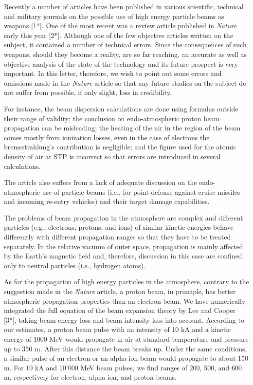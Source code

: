 \documentclass [12pt,a4paper,     ]{report} %
\begin{document}
\noindent  Recently a number of articles have been published in various scientific, technical and military journals on the possible use of high energy particle beams as weapons [1*]. One of the most recent was a review article published in \emph{Nature} early this year [2*].  Although one of the few objective articles written on the subject, it contained a number of technical errors.  Since the consequences of such weapons, should they become a reality, are so far reaching, an accurate as well as objective analysis of the state of the technology and its future prospect is very important.  In this letter, therefore, we wish to point out some errors and omissions made in the \emph{Nature} article so that any future studies on the subject do not suffer from possible, if only slight, loss in credibility.

   For instance, the beam dispersion calculations are done using formulas outside their range of validity; the conclusion on endo-atmospheric proton beam propagation can be misleading; the heating of the air in the region of the beam comes mostly from ionization losses, even in the case of electrons the bremsstrahlung's contribution is negligible; and the figure used for the atomic density of air at STP is incorrect so that errors are introduced in several calculations.

   The article also suffers from a lack of adequate discussion on the endo-atmospheric use of particle beams (i.e., for point defense against cruise-missiles and incoming re-entry vehicles) and their target damage capabilities.

   The problems of beam propagation in the atmosphere are complex and different particles (e.g., electrons, protons, and ions) of similar kinetic energies behave differently with different propagation ranges so that they have to be treated separately.  In the relative vacuum of outer space, propagation is mainly affected by the Earth's magnetic field and, therefore, discussion in this case are confined only to neutral particles (i.e., hydrogen atoms).
 

   As for the propagation of high energy particles in the atmosphere, contrary to the suggestion made in the \emph{Nature} article, a proton beam, in principle, has better atmospheric propagation properties than an electron beam.  We have numerically integrated the full equation of the beam expansion theory by Lee and Cooper [3*], taking beam energy loss and beam intensity loss into account.  According to our estimates, a proton beam pulse with an intensity of 10 kA and a kinetic energy of 1000 MeV would propagate in air at standard temperature and pressure up to 350 m.  After this distance the beam breaks up.  Under the same conditions, a similar pulse of an electron or an alpha ion beam would propagate to about 150 m.  For 10 kA and 10'000 MeV beam pulses, we find ranges of 200, 500, and 600 m, respectively for electron, alpha ion, and proton beams.
\end{document}
